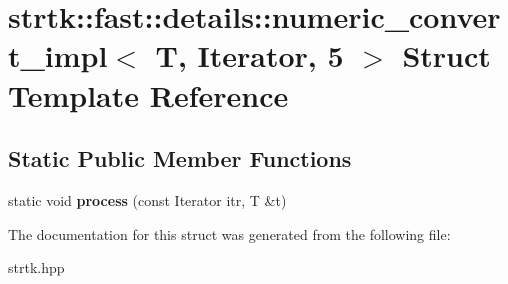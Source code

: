 \hypertarget{structstrtk_1_1fast_1_1details_1_1numeric__convert__impl_3_01T_00_01Iterator_00_015_01_4}{\section{strtk\-:\-:fast\-:\-:details\-:\-:numeric\-\_\-convert\-\_\-impl$<$ T, Iterator, 5 $>$ Struct Template Reference}
\label{structstrtk_1_1fast_1_1details_1_1numeric__convert__impl_3_01T_00_01Iterator_00_015_01_4}
}
\subsection*{Static Public Member Functions}
\begin{DoxyCompactItemize}
\item 
\hypertarget{structstrtk_1_1fast_1_1details_1_1numeric__convert__impl_3_01T_00_01Iterator_00_015_01_4_ab51020194b9d4285f584decdc3a53c51}{static void {\bfseries process} (const Iterator itr, T \&t)}\label{structstrtk_1_1fast_1_1details_1_1numeric__convert__impl_3_01T_00_01Iterator_00_015_01_4_ab51020194b9d4285f584decdc3a53c51}

\end{DoxyCompactItemize}


The documentation for this struct was generated from the following file\-:\begin{DoxyCompactItemize}
\item 
strtk.\-hpp\end{DoxyCompactItemize}
